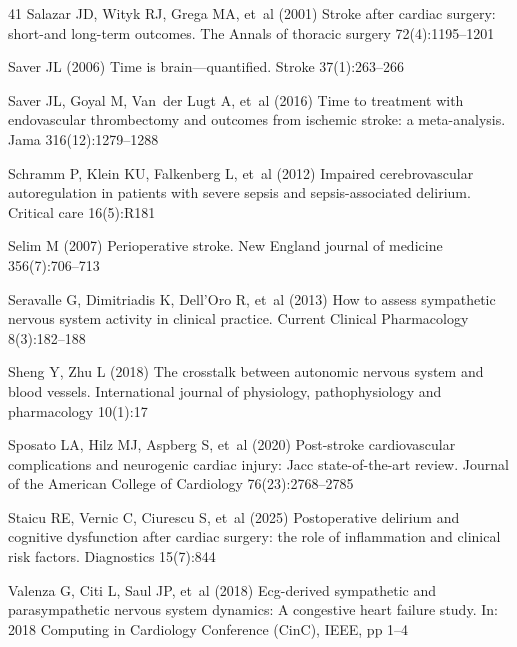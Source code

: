 \documentclass[pdflatex,sn-basic,Numbered]{sn-jnl}
\theoremstyle{thmstyleone}%
\theoremstyle{thmstyletwo}%
\theoremstyle{thmstylethree}%
\begin{document}
\begin{thebibliography}{41}
  Salazar JD, Wityk RJ, Grega MA, et~al (2001) Stroke after cardiac surgery:
  short-and long-term outcomes. The Annals of thoracic surgery 72(4):1195--1201

  Saver JL (2006) Time is brain—quantified. Stroke 37(1):263--266

  Saver JL, Goyal M, Van~der Lugt A, et~al (2016) Time to treatment with
  endovascular thrombectomy and outcomes from ischemic stroke: a meta-analysis.
  Jama 316(12):1279--1288

  Schramm P, Klein KU, Falkenberg L, et~al (2012) Impaired cerebrovascular
  autoregulation in patients with severe sepsis and sepsis-associated delirium.
  Critical care 16(5):R181

  Selim M (2007) Perioperative stroke. New England journal of medicine
  356(7):706--713

  Seravalle G, Dimitriadis K, Dell’Oro R, et~al (2013) How to assess
  sympathetic nervous system activity in clinical practice. Current Clinical
  Pharmacology 8(3):182--188

  Sheng Y, Zhu L (2018) The crosstalk between autonomic nervous system and blood
  vessels. International journal of physiology, pathophysiology and
  pharmacology 10(1):17

  Sposato LA, Hilz MJ, Aspberg S, et~al (2020) Post-stroke cardiovascular
  complications and neurogenic cardiac injury: Jacc state-of-the-art review.
  Journal of the American College of Cardiology 76(23):2768--2785

  Staicu RE, Vernic C, Ciurescu S, et~al (2025) Postoperative delirium and
  cognitive dysfunction after cardiac surgery: the role of inflammation and
  clinical risk factors. Diagnostics 15(7):844

  Valenza G, Citi L, Saul JP, et~al (2018) Ecg-derived sympathetic and
  parasympathetic nervous system dynamics: A congestive heart failure study.
  In: 2018 Computing in Cardiology Conference (CinC), IEEE, pp 1--4

\end{thebibliography}
\end{document}
